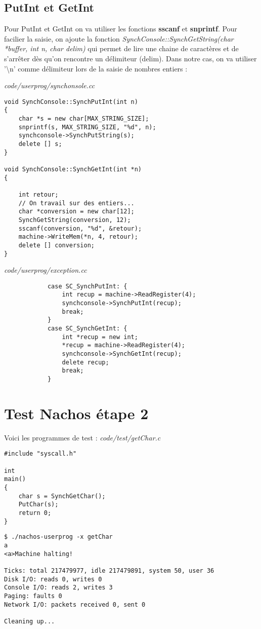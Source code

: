 \documentclass[a4paper,10pt]{article}
\begin{document}
\subsection{PutInt et GetInt}

Pour PutInt et GetInt on va utiliser les fonctions \textbf{sscanf} et
\textbf{snprintf}. Pour facilier la saisie, on ajoute la fonction
\textit{SynchConsole::SynchGetString(char *buffer, int n, char delim)} qui
permet de lire une chaine de caractères et de s'arrêter dès qu'on rencontre un
délimiteur (delim). Dans notre cas, on va utiliser '\textbackslash{n}'
comme délimiteur lors de la saisie de nombres entiers :

\textit{code/userprog/synchonsole.cc}
\begin{lstlisting}
void SynchConsole::SynchPutInt(int n)
{
	char *s = new char[MAX_STRING_SIZE];
	snprintf(s, MAX_STRING_SIZE, "%d", n);
	synchconsole->SynchPutString(s);
	delete [] s;
}

void SynchConsole::SynchGetInt(int *n)
{

	int retour;
	// On travail sur des entiers...
	char *conversion = new char[12];
	SynchGetString(conversion, 12);
	sscanf(conversion, "%d", &retour);
	machine->WriteMem(*n, 4, retour);
	delete [] conversion;
}
\end{lstlisting}

\textit{code/userprog/exception.cc}
\begin{lstlisting}
			case SC_SynchPutInt: {
				int recup = machine->ReadRegister(4);
				synchconsole->SynchPutInt(recup);
				break;
			}
			case SC_SynchGetInt: {
				int *recup = new int;
				*recup = machine->ReadRegister(4);
				synchconsole->SynchGetInt(recup);
				delete recup;
				break;
			}
\end{lstlisting}

\newpage

\section{Test Nachos étape 2}

Voici les programmes de test :
\textit{code/test/getChar.c}
\begin{lstlisting}
#include "syscall.h"

int
main()
{
	char s = SynchGetChar();
	PutChar(s);
	return 0;
}
\end{lstlisting}
\begin{lstlisting}
$ ./nachos-userprog -x getChar
a
<a>Machine halting!

Ticks: total 217479977, idle 217479891, system 50, user 36
Disk I/O: reads 0, writes 0
Console I/O: reads 2, writes 3
Paging: faults 0
Network I/O: packets received 0, sent 0

Cleaning up...
\end{lstlisting}
\end{document}
